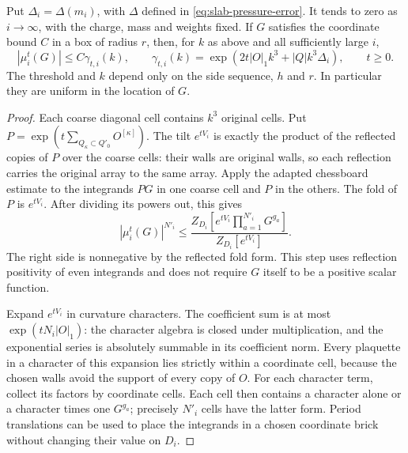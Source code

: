 \documentclass[11pt,letterpaper,reqno]{amsart}
\begin{document}
\begin{proposition}\label{thm:diag-amplification}
Put $\Delta_i=\Delta(m_i)$, with $\Delta$ defined in
\eqref{eq:slab-pressure-error}. It tends to zero as $i\to\infty$,
with the charge, mass and weights fixed.
If $G$ satisfies the coordinate bound $C$ in a box of radius $r$,
then, for $k$ as above and all sufficiently large $i$,
\begin{equation}\label{eq:diag-amplification}
 |\mu_i^t(G)|\le C\gamma_{t,i}(k),\qquad
 \gamma_{t,i}(k)=
      \exp(2t|O|_1k^3+|Q|k^3\Delta_i),\qquad t\ge0.
\end{equation}
The threshold and $k$ depend only on the side sequence, $h$ and
$r$. In particular they are uniform in the location of $G$.
\end{proposition}

\begin{proof}
Each coarse diagonal cell contains $k^3$ original cells. Put
$P=\exp(t\sum_{Q_\kappa\subset Q'_0}O^{[\kappa]})$. The tilt
$e^{tV_i}$ is exactly the product of the reflected copies of $P$
over the coarse cells: their walls are original walls, so each
reflection carries the original array to the same array. Apply
the adapted chessboard estimate to the integrands $PG$ in one
coarse cell and $P$ in the others. The fold of $P$ is $e^{tV_i}$.
After dividing its powers out, this gives
\begin{equation}\label{eq:diag-amplified-power}
 |\mu_i^t(G)|^{N'_i}
 \le\frac{Z_{D_i}[e^{tV_i}\prod_{a=1}^{N'_i}G^{g_a}]}
              {Z_{D_i}[e^{tV_i}]}.
\end{equation}
The right side is nonnegative by the reflected fold form. This
step uses reflection positivity of even integrands and does not
require $G$ itself to be a positive scalar function.

Expand $e^{tV_i}$ in curvature characters. The coefficient sum
is at most $\exp(tN_i|O|_1)$: the character algebra is closed
under multiplication, and the exponential series is absolutely
summable in its coefficient norm. Every plaquette in a character
of this expansion lies strictly within a coordinate cell,
because the chosen walls avoid the support of every copy of $O$.
For each character term, collect its factors by coordinate cells.
Each cell then contains a character alone or a character times
one $G^{g_a}$; precisely $N'_i$ cells have the latter form. Period
translations can be used to place the integrands in a chosen
coordinate brick without changing their value on $D_i$.


\end{proof}
\end{document}
